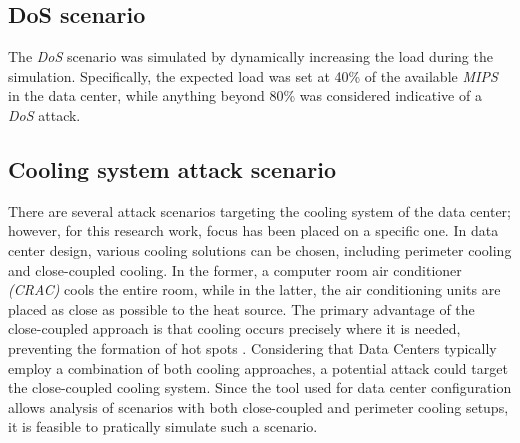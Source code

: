 \subsection{DoS scenario}
The \emph{DoS} scenario was simulated by dynamically increasing the load during the simulation. Specifically, the expected load was set at 40\% of the available \emph{MIPS} in the data center, while anything beyond 80\% was considered indicative of a \emph{DoS} attack.

\subsection{Cooling system attack scenario} \label{subsection:coolingsystemattack}
There are several attack scenarios targeting the cooling system of the data center; however, for this research work, focus has been placed on a specific one. In data center design, various cooling solutions can be chosen, including perimeter cooling and close-coupled cooling. In the former, a computer room air conditioner \emph{(CRAC)} cools the entire room, while in the latter, the air conditioning units are placed as close as possible to the heat source. The primary advantage of the close-coupled approach is that cooling occurs precisely where it is needed, preventing the formation of hot spots \cite{anixter}.
Considering that Data Centers typically employ a combination of both cooling approaches, a potential attack could target the close-coupled cooling system. Since the tool used for data center configuration allows analysis of scenarios with both close-coupled and perimeter cooling setups, it is feasible to pratically simulate such a scenario. 

